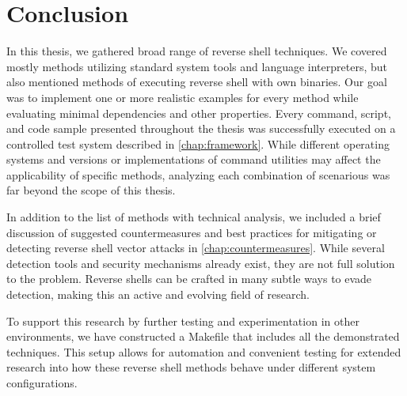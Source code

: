 \chapter*{Conclusion}

In this thesis, we gathered broad range of reverse shell techniques. We covered mostly methods utilizing standard system tools and language interpreters, but also mentioned methods of executing reverse shell with own binaries. Our goal was to implement one or more realistic examples for every method while evaluating minimal dependencies and other properties. Every command, script, and code sample presented throughout the thesis was successfully executed on a controlled test system described in \cref{chap:framework}. While different operating systems and versions or implementations of command utilities may affect the applicability of specific methods, analyzing each combination of scenarious was far beyond the scope of this thesis.

In addition to the list of methods with technical analysis, we included a brief discussion of suggested countermeasures and best practices for mitigating or detecting reverse shell vector attacks in \cref{chap:countermeasures}. While several detection tools and security mechanisms already exist, they are not full solution to the problem. Reverse shells can be crafted in many subtle ways to evade detection, making this an active and evolving field of research.

To support this research by further testing and experimentation in other environments, we have constructed a Makefile that includes all the demonstrated techniques. This setup allows for automation and convenient testing for extended research into how these reverse shell methods behave under different system configurations.
